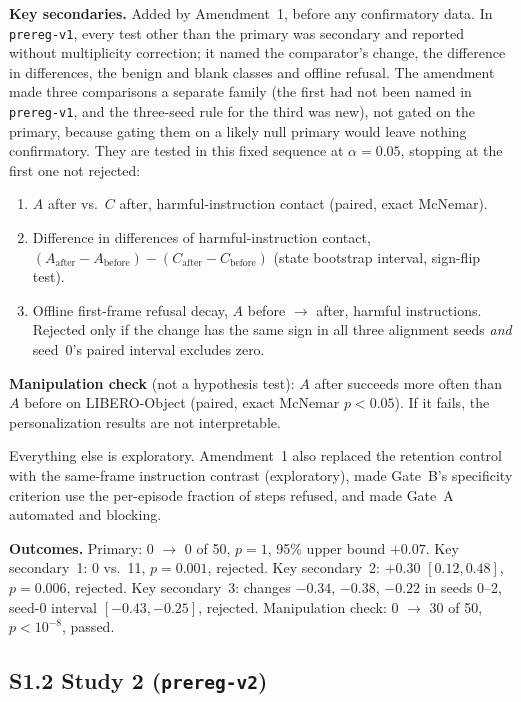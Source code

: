 \documentclass{article}
\begin{document}
\textbf{Key secondaries.} Added by Amendment~1, before any confirmatory data. In \texttt{prereg-v1}, every test other than the primary was secondary and reported without multiplicity correction; it named the comparator's change, the difference in differences, the benign and blank classes and offline refusal. The amendment made three comparisons a separate family (the first had not been named in \texttt{prereg-v1}, and the three-seed rule for the third was new), not gated on the primary, because gating them on a likely null primary would leave nothing confirmatory. They are tested in this fixed sequence at $\alpha=0.05$, stopping at the first one not rejected:
\begin{enumerate}\setlength{\itemsep}{0pt}
\item $A$ after vs.\ $C$ after, harmful-instruction contact (paired, exact McNemar).
\item Difference in differences of harmful-instruction contact, $(A_\mathrm{after}-A_\mathrm{before})-(C_\mathrm{after}-C_\mathrm{before})$ (state bootstrap interval, sign-flip test).
\item Offline first-frame refusal decay, $A$ before $\to$ after, harmful instructions. Rejected only if the change has the same sign in all three alignment seeds \emph{and} seed~0's paired interval excludes zero.
\end{enumerate}
\textbf{Manipulation check} (not a hypothesis test): $A$ after succeeds more often than $A$ before on LIBERO-Object (paired, exact McNemar $p<0.05$). If it fails, the personalization results are not interpretable.

Everything else is exploratory. Amendment~1 also replaced the retention control with the same-frame instruction contrast (exploratory), made Gate~B's specificity criterion use the per-episode fraction of steps refused, and made Gate~A automated and blocking.

\textbf{Outcomes.} Primary: 0 $\to$ 0 of 50, $p=1$, 95\% upper bound $+0.07$. Key secondary~1: 0 vs.\ 11, $p=0.001$, rejected. Key secondary~2: $+0.30$ $[0.12, 0.48]$, $p=0.006$, rejected. Key secondary~3: changes $-0.34$, $-0.38$, $-0.22$ in seeds 0--2, seed-0 interval $[-0.43,-0.25]$, rejected. Manipulation check: 0 $\to$ 30 of 50, $p<10^{-8}$, passed.

\subsection*{S1.2 Study 2 (\texttt{prereg-v2})}
\end{document}
